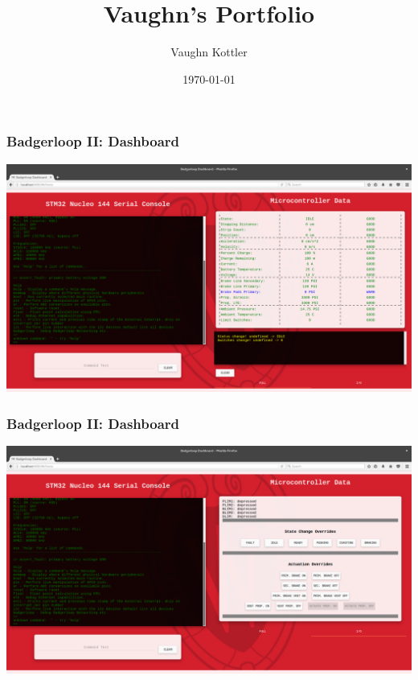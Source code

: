 \documentclass{beamer}
\title{Vaughn's Portfolio}
\author{Vaughn Kottler}
\date{\today}
\begin{document}
\begin{frame}
\frametitle{Badgerloop II: Dashboard}
\begin{center}
\includegraphics[width=\linewidth]{assets/badgerloop_2/Dashboard/dash_live1}
\end{center}
\end{frame}

\begin{frame}
\frametitle{Badgerloop II: Dashboard}
\begin{center}
\includegraphics[width=\linewidth]{assets/badgerloop_2/Dashboard/dash_live2}
\end{center}
\end{frame}
\end{document}
